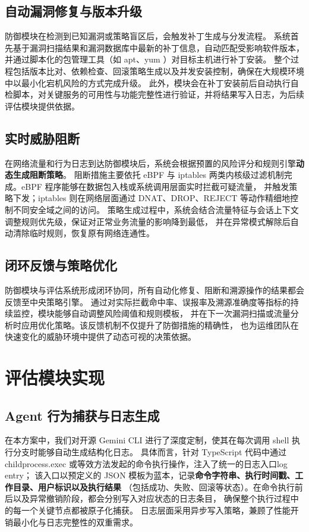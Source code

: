 \documentclass[lang=cn,10pt]{elegantbook}
\begin{document}
\subsection{自动漏洞修复与版本升级}  
防御模块在检测到已知漏洞或策略盲区后，会触发补丁生成与分发流程。
系统首先基于漏洞扫描结果和漏洞数据库中最新的补丁信息，自动匹配受影响软件版本，
并通过脚本化的包管理工具（如 apt、yum ）对目标主机进行补丁安装。
整个过程包括版本比对、依赖检查、回滚策略生成以及并发安装控制，确保在大规模环境中以最小化宕机风险的方式完成升级。
此外，模块会在补丁安装前后自动执行自检脚本，对关键服务的可用性与功能完整性进行验证，并将结果写入日志，为后续评估模块提供依据。

\subsection{实时威胁阻断}  
在网络流量和行为日志到达防御模块后，系统会根据预置的风险评分和规则引擎\textbf{动态生成阻断策略}。
阻断措施主要依托 eBPF 与 iptables 两类内核级过滤机制完成。eBPF 程序能够在数据包入栈或系统调用层面实时拦截可疑流量，
并触发策略下发；iptables 则在网络层面通过 DNAT、DROP、REJECT 等动作精细地控制不同安全域之间的访问。
策略生成过程中，系统会结合流量特征与会话上下文调整规则优先级，保证对正常业务流量的影响降到最低，
并在异常模式解除后自动清除临时规则，恢复原有网络连通性。

\subsection{闭环反馈与策略优化}  
防御模块与评估系统形成闭环协同，所有自动化修复、阻断和溯源操作的结果都会反馈至中央策略引擎。
通过对实际拦截命中率、误报率及溯源准确度等指标的持续监控，模块能够自动调整风险阈值和规则模板，
并在下一次漏洞扫描或流量分析时应用优化策略。该反馈机制不仅提升了防御措施的精确性，
也为运维团队在快速变化的威胁环境中提供了动态可视的决策依据。




\section{评估模块实现}

\subsection{Agent 行为捕获与日志生成}
在本方案中，我们对开源 Gemini CLI 进行了深度定制，使其在每次调用 shell 执行分支时能够自动生成结构化日志。
具体而言，针对 TypeScript 代码中通过 childprocess.exec 或等效方法发起的命令执行操作，注入了统一的日志入口log entry；
该入口以预定义的 JSON 模板为蓝本，记录\textbf{命令字符串、执行时间戳、工作目录、用户标识以及执行结果}
（包括成功、失败、回滚等状态）。在命令执行前后以及异常撤销阶段，都会分别写入对应状态的日志条目，
确保整个执行过程中的每一个关键节点都被原子化捕获。
日志层面采用异步写入策略，兼顾了性能开销最小化与日志完整性的双重需求。
\end{document}
